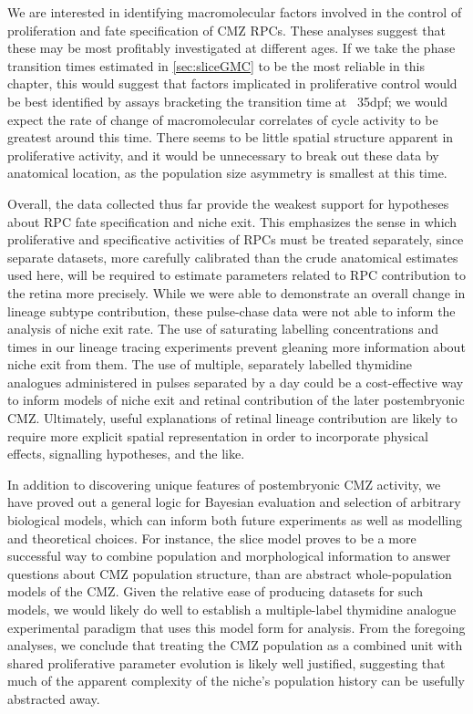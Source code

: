 We are interested in identifying macromolecular factors involved in the control of proliferation and fate specification of CMZ RPCs. These analyses suggest that these may be most profitably investigated at different ages. If we take the phase transition times estimated in \autoref{sec:sliceGMC} to be the most reliable in this chapter, this would suggest that factors implicated in proliferative control would be best identified by assays bracketing the transition time at ~35dpf; we would expect the rate of change of macromolecular correlates of cycle activity to be greatest around this time. There seems to be little spatial structure apparent in proliferative activity, and it would be unnecessary to break out these data by anatomical location, as the population size asymmetry is smallest at this time.

Overall, the data collected thus far provide the weakest support for hypotheses about RPC fate specification and niche exit. This emphasizes the sense in which proliferative and specificative activities of RPCs must be treated separately, since separate datasets, more carefully calibrated than the crude anatomical estimates used here, will be required to estimate parameters related to RPC contribution to the retina more precisely. While we were able to demonstrate an overall change in lineage subtype contribution, these pulse-chase data were not able to inform the analysis of niche exit rate. The use of saturating labelling concentrations and times in our lineage tracing experiments prevent gleaning more information about niche exit from them. The use of multiple, separately labelled thymidine analogues administered in pulses separated by a day could be a cost-effective way to inform models of niche exit and retinal contribution of the later postembryonic CMZ. Ultimately, useful explanations of retinal lineage contribution are likely to require more explicit spatial representation in order to incorporate physical effects, signalling hypotheses, and the like.

In addition to discovering unique features of postembryonic CMZ activity, we have proved out a general logic for Bayesian evaluation and selection of arbitrary biological models, which can inform both future experiments as well as modelling and theoretical choices. For instance, the slice model proves to be a more successful way to combine population and morphological information to answer questions about CMZ population structure, than are abstract whole-population models of the CMZ. Given the relative ease of producing datasets for such models, we would likely do well to establish a multiple-label thymidine analogue experimental paradigm that uses this model form for analysis. From the foregoing analyses, we conclude that treating the CMZ population as a combined unit with shared proliferative parameter evolution is likely well justified, suggesting that much of the apparent complexity of the niche's population history can be usefully abstracted away.
